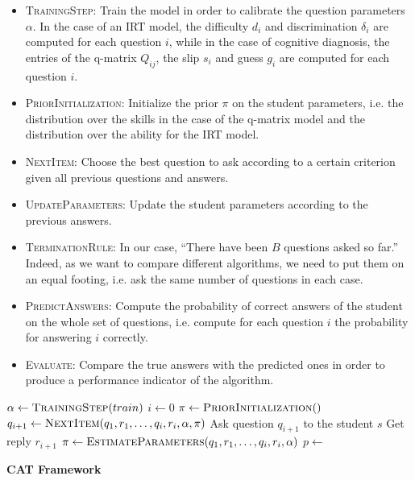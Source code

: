 \documentclass{sig-alternate}
\begin{document}
\begin{itemize}
\item \textsc{TrainingStep}: Train the model in order to calibrate the question parameters $\alpha$. In the case of an IRT model, the difficulty $d_i$ and discrimination $\delta_i$ are computed for each question $i$, while in the case of cognitive diagnosis, the entries of the q-matrix $Q_{ij}$, the slip $s_i$ and guess $g_i$ are computed for each question $i$.
\item \textsc{PriorInitialization}: Initialize the prior $\pi$ on the student parameters, i.e. the distribution over the skills in the case of the q-matrix model and the distribution over the ability for the IRT model. 
\item \textsc{NextItem}: Choose the best question to ask according to a certain criterion given all previous questions and answers. 
\item \textsc{UpdateParameters}: Update the student parameters according to the previous answers.
\item \textsc{TerminationRule}: In our case, ``There have been $B$ questions asked so far.'' Indeed, as we want to compare different algorithms, we need to put them on an equal footing, i.e. ask the same number of questions in each case.
\item \textsc{PredictAnswers}: Compute the probability of correct answers of the student on the whole set of questions, i.e. compute for each question $i$ the probability for answering $i$ correctly.
\item \textsc{Evaluate}: Compare the true answers with the predicted ones in order to produce a performance indicator of the algorithm. 
\end{itemize}

\begin{algorithm}
\begin{algorithmic}
\State $\alpha \gets \Call{TrainingStep}{train}$
\State $i \gets 0$
	\State $\pi \gets \Call{PriorInitialization}$
		\State $q_{i + 1} \gets \Call{NextItem}{q_1, r_1, \ldots, q_i, r_i, \alpha, \pi}$
		\State Ask question $q_{i + 1}$ to the student $s$
		\State Get reply $r_{i + 1}$
		\State $\pi \gets \Call{EstimateParameters}{q_1, r_1, \ldots, q_i, r_i, \alpha}$
		\State $p \gets$ 
		\State {}
	\EndWhile
\EndFor
\EndProcedure
\end{algorithmic}
\caption{\textbf{CAT Framework}}
\end{algorithm}
\end{document}
